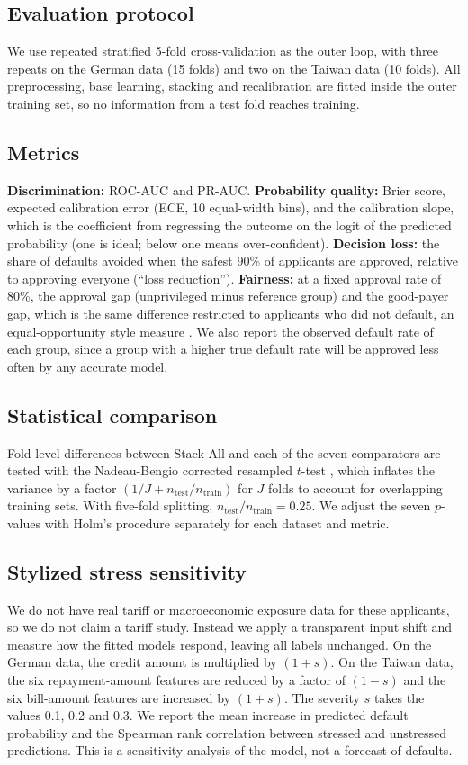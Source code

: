 \subsection{Evaluation protocol}
We use repeated stratified 5-fold cross-validation as the outer loop, with three repeats on the German data (15 folds) and two on the Taiwan data (10 folds). All preprocessing, base learning, stacking and recalibration are fitted inside the outer training set, so no information from a test fold reaches training.

\subsection{Metrics}
\textbf{Discrimination:} ROC-AUC and PR-AUC. \textbf{Probability quality:} Brier score, expected calibration error (ECE, 10 equal-width bins), and the calibration slope, which is the coefficient from regressing the outcome on the logit of the predicted probability (one is ideal; below one means over-confident). \textbf{Decision loss:} the share of defaults avoided when the safest 90\% of applicants are approved, relative to approving everyone (``loss reduction''). \textbf{Fairness:} at a fixed approval rate of 80\%, the approval gap (unprivileged minus reference group) and the good-payer gap, which is the same difference restricted to applicants who did not default, an equal-opportunity style measure \cite{hardt}. We also report the observed default rate of each group, since a group with a higher true default rate will be approved less often by any accurate model.

\subsection{Statistical comparison}
Fold-level differences between Stack-All and each of the seven comparators are tested with the Nadeau-Bengio corrected resampled $t$-test \cite{r25}, which inflates the variance by a factor $(1/J + n_{\mathrm{test}}/n_{\mathrm{train}})$ for $J$ folds to account for overlapping training sets. With five-fold splitting, $n_{\mathrm{test}}/n_{\mathrm{train}}=0.25$. We adjust the seven $p$-values with Holm's procedure \cite{holm} separately for each dataset and metric.

\subsection{Stylized stress sensitivity}
We do not have real tariff or macroeconomic exposure data for these applicants, so we do not claim a tariff study. Instead we apply a transparent input shift and measure how the fitted models respond, leaving all labels unchanged. On the German data, the credit amount is multiplied by $(1+s)$. On the Taiwan data, the six repayment-amount features are reduced by a factor of $(1-s)$ and the six bill-amount features are increased by $(1+s)$. The severity $s$ takes the values 0.1, 0.2 and 0.3. We report the mean increase in predicted default probability and the Spearman rank correlation between stressed and unstressed predictions. This is a sensitivity analysis of the model, not a forecast of defaults.

